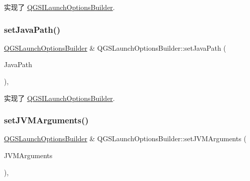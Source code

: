 实现了 \mbox{\hyperlink{class_q_g_s_i_launch_options_builder_a4c29f3bf074aec2d11c5b661b9b95271}{Q\+G\+S\+I\+Launch\+Options\+Builder}}.

\mbox{\label{class_q_g_s_launch_options_builder_a4bfe1a9c72306f54ea25120cd605d090}} 
\subsubsection{\texorpdfstring{set\+Java\+Path()}{setJavaPath()}}
{\footnotesize\ttfamily \mbox{\hyperlink{class_q_g_s_launch_options_builder}{Q\+G\+S\+Launch\+Options\+Builder}} \& Q\+G\+S\+Launch\+Options\+Builder\+::set\+Java\+Path (\begin{DoxyParamCaption}\item[{const Q\+String \&}]{Java\+Path }\end{DoxyParamCaption})\hspace{0.3cm}{\ttfamily [override]}, {\ttfamily [virtual]}}



实现了 \mbox{\hyperlink{class_q_g_s_i_launch_options_builder_a45ab3737e587d9d7e01af6f635c815b9}{Q\+G\+S\+I\+Launch\+Options\+Builder}}.

\mbox{\label{class_q_g_s_launch_options_builder_ad0f4f7bc30016b6ceb79d91330f8e6a1}} 
\subsubsection{\texorpdfstring{set\+J\+V\+M\+Arguments()}{setJVMArguments()}\hspace{0.1cm}{\footnotesize\ttfamily [1/2]}}
{\footnotesize\ttfamily \mbox{\hyperlink{class_q_g_s_launch_options_builder}{Q\+G\+S\+Launch\+Options\+Builder}} \& Q\+G\+S\+Launch\+Options\+Builder\+::set\+J\+V\+M\+Arguments (\begin{DoxyParamCaption}\item[{const Q\+String \&}]{J\+V\+M\+Arguments }\end{DoxyParamCaption})\hspace{0.3cm}{\ttfamily [override]}, {\ttfamily [virtual]}}



